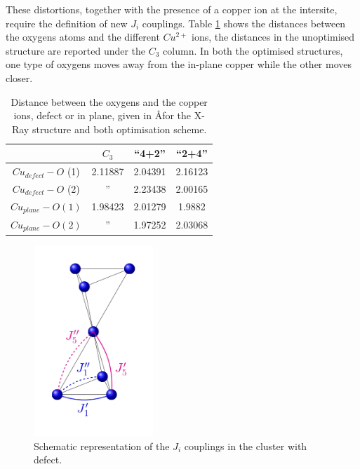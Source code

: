 \documentclass[12pt]{report}
\numberwithin{equation}{section}
\begin{document}
These distortions, together with the presence of a copper ion at the intersite, require the definition of new $J_i$ couplings.
Table \ref{tab:DefautDist} shows the distances between the oxygens atoms and the different $Cu^{2+}$ ions, the distances in the unoptimised structure are reported under the $C_3$ column.
In both the optimised structures, one type of oxygens moves away from the in-plane copper while the other moves closer.
\begin{table}[!ht]
    \centering
    \begin{tabular}{c | c c c}
        & $C_3$ & ``4+2'' & ``2+4''\\
        \hline
        \hline
        $Cu_{defect}-O$ (1) & 2.11887 & 2.04391 & 2.16123 \\
        $Cu_{defect}-O$ (2) & '' & 2.23438 & 2.00165 \\
        \hline
        $Cu_{plane}-O (1)$ & 1.98423 & 2.01279 & 1.9882\\
        $Cu_{plane}-O (2)$  & '' & 1.97252 & 2.03068\\
    \end{tabular}
    \caption{Distance between the oxygens and the copper ions, defect or in plane, given in \AA for the X-Ray structure and both optimisation scheme.}
    \label{tab:DefautDist}
\end{table}

\begin{figure}[!ht]
    \centering
    \includegraphics[width=0.4\textwidth]{Images/CouplageInterplan.jpg}
    \caption[]{Schematic representation of the $J_i$ couplings in the cluster with defect.}
    \label{fig:CouplageInterplan}
\end{figure}
\end{document}
